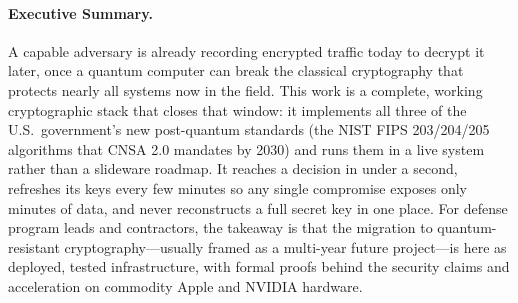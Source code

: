 \documentclass[11pt,letterpaper]{article}
\begin{document}
\makecover

\begin{abstract}
We present a comprehensive cryptographic architecture implementing all three \nist{} post-quantum standards---ML-DSA (), ML-KEM (), and SLH-DSA ()---integrated into a production blockchain consensus system with hybrid classical/quantum security. The Quasar consensus protocol achieves sub-second finality through dual-certificate blocks combining BLS12-381 aggregate signatures with Corona lattice-based threshold signatures, providing an attack window of $\leq$50~ms. We detail six threshold multi-party computation schemes (CGGMP21, FROST, LSS, BLS, SR25519, TFHE) operating over a zero-copy wire protocol, GPU-accelerated cryptographic operations on Metal and CUDA, fully homomorphic encryption via a dedicated virtual machine, and a comprehensive key management system with Shamir secret sharing, HSM integration, and HIPAA/SOX/SEC compliance controls. The architecture provides defense-in-depth against both current and quantum adversaries, with 17 formal cryptographic proofs supporting security claims.
\end{abstract}

\paragraph{Executive Summary.}
A capable adversary is already recording encrypted traffic today to decrypt it later, once a quantum computer can break the classical cryptography that protects nearly all systems now in the field. This work is a complete, working cryptographic stack that closes that window: it implements all three of the U.S.\ government's new post-quantum standards (the NIST FIPS 203/204/205 algorithms that CNSA 2.0 mandates by 2030) and runs them in a live system rather than a slideware roadmap. It reaches a decision in under a second, refreshes its keys every few minutes so any single compromise exposes only minutes of data, and never reconstructs a full secret key in one place. For defense program leads and contractors, the takeaway is that the migration to quantum-resistant cryptography---usually framed as a multi-year future project---is here as deployed, tested infrastructure, with formal proofs behind the security claims and acceleration on commodity Apple and NVIDIA hardware.

\tableofcontents
\newpage

\end{document}
